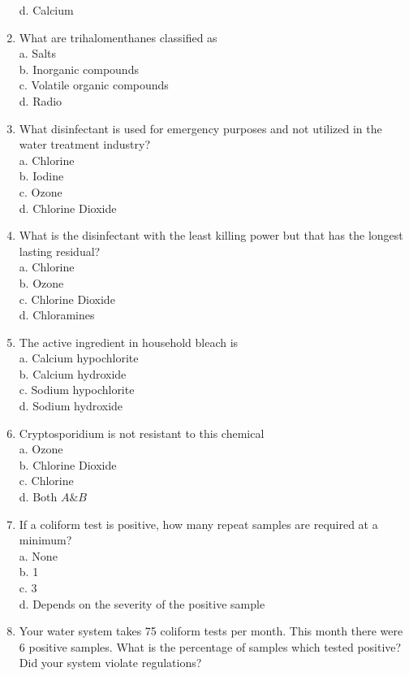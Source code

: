 \begin{enumerate}[1.]
d. Calcium\\
\item What are trihalomenthanes classified as\\
a. Salts\\
b. Inorganic compounds\\
c. Volatile organic compounds\\
d. Radio\\
\item What disinfectant is used for emergency purposes and not utilized in the water treatment industry?\\
a. Chlorine\\
b. Iodine\\
c. Ozone\\
d. Chlorine Dioxide\\
\item What is the disinfectant with the least killing power but that has the longest lasting residual?\\
a. Chlorine\\
b. Ozone\\
c. Chlorine Dioxide\\
d. Chloramines\\
\item The active ingredient in household bleach is\\
a. Calcium hypochlorite\\
b. Calcium hydroxide\\
c. Sodium hypochlorite\\
d. Sodium hydroxide\\
\item Cryptosporidium is not resistant to this chemical\\
a. Ozone\\
b. Chlorine Dioxide\\
c. Chlorine\\
d. Both $A \& B$\\
\item If a coliform test is positive, how many repeat samples are required at a minimum?\\
a. None\\
b. 1\\
c. 3\\
d. Depends on the severity of the positive sample\\
\item Your water system takes 75 coliform tests per month. This month there were 6 positive samples. What is the percentage of samples which tested positive? Did your system violate regulations?\\

\end{enumerate}
